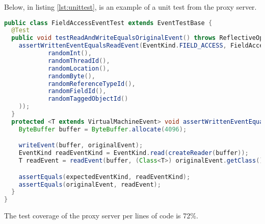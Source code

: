 \documentclass[..thesis.tex]{subfiles}
\begin{document}
Below, in listing \ref{lst:unittest}, is an example of a unit test from the proxy server.

\begin{lstlisting}[language=Java, caption={\textit{A unit test testing whether reading and writing a data field of a particular JVM event returns identical bytes to the original event.}}, captionpos=b, label={lst:unittest}]
public class FieldAccessEventTest extends EventTestBase {
  @Test
  public void testReadAndWriteEqualsOriginalEvent() throws ReflectiveOperationException {
    assertWrittenEventEqualsReadEvent(EventKind.FIELD_ACCESS, FieldAccessEvent.create(
            randomInt(),
            randomThreadId(),
            randomLocation(),
            randomByte(),
            randomReferenceTypeId(),
            randomFieldId(),
            randomTaggedObjectId()
    ));
  }
  protected <T extends VirtualMachineEvent> void assertWrittenEventEqualsReadEvent(EventKind expectedEventKind, T originalEvent) throws ReflectiveOperationException {
    ByteBuffer buffer = ByteBuffer.allocate(4096);

    writeEvent(buffer, originalEvent);
    EventKind readEventKind = EventKind.read(createReader(buffer));
    T readEvent = readEvent(buffer, (Class<T>) originalEvent.getClass());

    assertEquals(expectedEventKind, readEventKind);
    assertEquals(originalEvent, readEvent);
  }
}
\end{lstlisting}

The test coverage of the proxy server per lines of code is 72\%.
\end{document}
